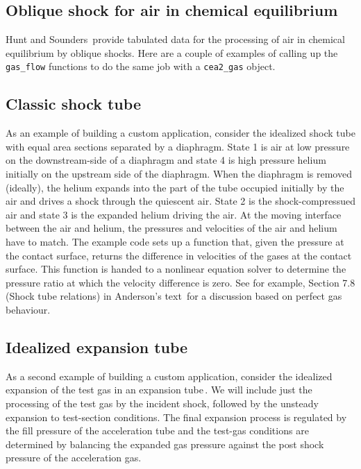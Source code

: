 \documentclass[landscape,12pt,a4paper]{article}
\begin{document}
\bigskip
\subsection{Oblique shock for air in chemical equilibrium}
%
Hunt and Sounders\,\cite{hunt_souders_1975a} provide tabulated data for the processing
of air in chemical equilibrium by oblique shocks.
Here are a couple of examples of calling up the \verb!gas_flow! functions to do the same job
with a \verb!cea2_gas! object.






\subsection{Classic shock tube}
%
As an example of building a custom application, consider the idealized shock tube 
with equal area sections separated by a diaphragm.
State 1 is air at low pressure on the downstream-side of a diaphragm and 
state 4 is high pressure helium initially on the upstream side of the diaphragm.
When the diaphragm is removed (ideally), the helium expands into the part of the tube
occupied initially by the air and drives a shock through the quiescent air.
State 2 is the shock-compressued air and state 3 is the expanded helium
driving the air.
At the moving interface between the air and helium, the pressures and velocities
of the air and helium have to match.
The example code sets up a function that, given the pressure at the contact surface,
returns the difference in velocities of the gases at the contact surface.
This function is handed to a nonlinear equation solver to determine the pressure ratio
at which the velocity difference is zero.
See for example, Section 7.8 (Shock tube relations) in Anderson's text\,\cite{anderson_82}
for a discussion based on perfect gas behaviour.



\bigskip
\subsection{Idealized expansion tube}
%
As a second example of building a custom application, consider the idealized expansion
of the test gas in an expansion tube\,\cite{trimpi_62}.
We will include just the processing of the test gas by the incident shock,
followed by the unsteady expansion to test-section conditions. 
The final expansion process is regulated by the fill pressure of the acceleration tube
and the test-gas conditions are determined by balancing the expanded gas pressure against
the post shock pressure of the acceleration gas.
\end{document}
